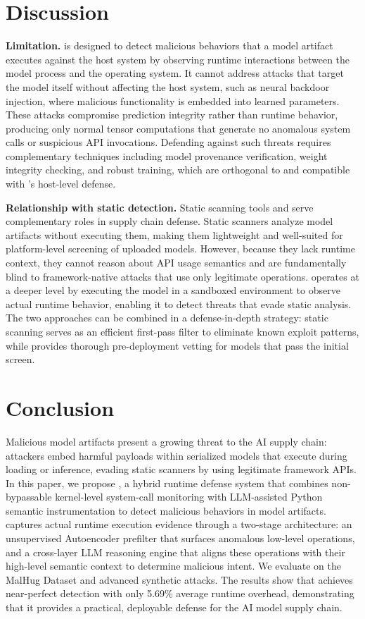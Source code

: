 \section{Discussion}\label{sec:discussion}


\noindent \textbf{Limitation.} 
\toolname{} is designed to detect malicious behaviors that a model artifact executes against the host system by observing runtime interactions between the model process and the operating system. It cannot address attacks that target the model itself without affecting the host system, such as neural backdoor injection, where malicious functionality is embedded into learned parameters. These attacks compromise prediction integrity rather than runtime behavior, producing only normal tensor computations that generate no anomalous system calls or suspicious API invocations. Defending against such threats requires complementary techniques including model provenance verification, weight integrity checking, and robust training, which are orthogonal to and compatible with \toolname{}'s host-level defense.

\noindent \textbf{Relationship with static detection.} Static scanning tools and \toolname{} serve complementary roles in supply chain defense. Static scanners analyze model artifacts without executing them, making them lightweight and well-suited for platform-level screening of uploaded models. However, because they lack runtime context, they cannot reason about API usage semantics and are fundamentally blind to framework-native attacks that use only legitimate operations. \toolname{} operates at a deeper level by executing the model in a sandboxed environment to observe actual runtime behavior, enabling it to detect threats that evade static analysis. The two approaches can be combined in a defense-in-depth strategy: static scanning serves as an efficient first-pass filter to eliminate known exploit patterns, while \toolname{} provides thorough pre-deployment vetting for models that pass the initial screen.


\section{Conclusion}\label{sec:conclusion}

Malicious model artifacts present a growing threat to the AI supply chain: attackers embed harmful payloads within serialized models that execute during loading or inference, evading static scanners by using legitimate framework APIs. In this paper, we propose \toolname{}, a hybrid runtime defense system that combines non-bypassable kernel-level system-call monitoring with LLM-assisted Python semantic instrumentation to detect malicious behaviors in model artifacts. \toolname{} captures actual runtime execution evidence through a two-stage architecture: an unsupervised Autoencoder prefilter that surfaces anomalous low-level operations, and a cross-layer LLM reasoning engine that aligns these operations with their high-level semantic context to determine malicious intent. We evaluate \toolname{} on the MalHug Dataset and advanced synthetic attacks. The results show that \toolname{} achieves near-perfect detection with only 5.69\% average runtime overhead, demonstrating that it provides a practical, deployable defense for the AI model supply chain.